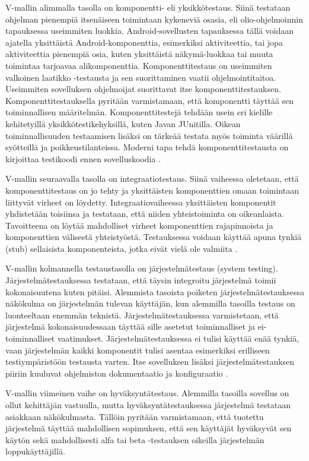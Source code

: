 V-mallin alimmalla tasolla on komponentti- eli yksikkötestaus. Siinä testataan ohjelman pienempiä itsenäiseen toimintaan kykeneviä osasia, eli olio-ohjelmoinnin tapauksessa useimmiten luokkia. Android-sovellusten tapauksessa tällä voidaan ajatella yksittäistä Android-komponenttia, esimerkiksi aktiviteettia, tai jopa aktiviteettia pienempiä osia, kuten yksittäistä näkymä-luokkaa tai muuta toimintaa tarjoavaa alikomponenttia. Komponenttitestaus on useimmiten valkoinen laatikko -testausta ja sen suorittaminen vaatii ohjelmointitaitoa. Useimmiten sovelluksen ohjelmoijat suorittavat itse komponenttitestauksen. Komponenttitestauksella pyritään varmistamaan, että komponentti täyttää sen toiminnallisen määritelmän. Komponenttitestejä tehdään usein eri kielille kehitetyillä yksikkötestikehyksillä, kuten Javan JUnitilla. Oikean toiminnallisuuden testaamisen lisäksi on tärkeää testata myös toiminta väärillä syötteillä ja poikkeustilanteissa. Moderni tapa tehdä komponenttitestausta on kirjoittaa testikoodi ennen sovelluskoodia \cite[43-50]{testing_foundations}.

V-mallin seuraavalla tasolla on integraatiotestaus. Siinä vaiheessa oletetaan, että komponenttitestaus on jo tehty ja yksittäisten komponenttien omaan toimintaan liittyvät virheet on löydetty. Integraatiovaiheessa yksittäisten komponentit yhdistetään toisiinsa ja testataan, että niiden yhteistoiminta on oikeanlaista. Tavoitteena on löytää mahdolliset virheet komponenttien rajapinnoista ja komponenttien välisestä yhteistyöstä. Testauksessa voidaan käyttää apuna tynkiä (stub) sellaisista komponenteista, jotka eivät vielä ole valmiita \cite[50-52]{testing_foundations}.

V-mallin kolmannella testaustasolla on järjestelmätestaus (system testing). Järjestelmätestauksessa testataan, että täysin integroitu järjestelmä toimii kokonaisuutena kuten pitäisi. Alemmista tasoista poiketen järjestelmätestauksessa näkökulma on järjestelmän tulevan käyttäjän, kun alemmilla tasoilla testaus on luonteeltaan enemmän teknistä. Järjestelmätestauksessa varmistetaan, että järjestelmä kokonaisuudessaan täyttää sille asetetut toiminnalliset ja ei-toiminnalliset vaatimukset. Järjestelmätestauksessa ei tulisi käyttää enää tynkiä, vaan järjestelmän kaikki komponentit tulisi asentaa esimerkiksi erilliseen testiympäristöön testausta varten. Itse sovelluksen lisäksi järjestelmätestauksen piiriin kuuluvat ohjelmiston dokumentaatio ja konfiguraatio \cite[58-61]{testing_foundations}.

V-mallin viimeinen vaihe on hyväksyntätestaus. Alemmilla tasoilla sovellus on ollut kehittäjän vastuulla, mutta hyväksyntätestauksessa järjestelmä testataan asiakkaan näkökulmasta. Tällöin pyritään varmistamaan, että tuotettu järjestelmä täyttää mahdollisen sopimuksen, että sen käyttäjät hyväksyvät sen käytön sekä mahdollisesti alfa tai beta -testauksen oikeilla järjestelmän loppukäyttäjillä.\cite[62-63]{testing_foundations}

